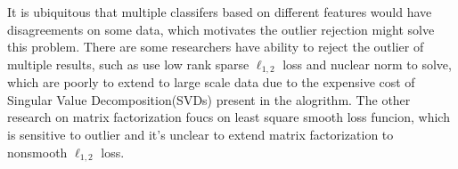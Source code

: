 \documentclass[letterpaper]{article}
\begin{document}


It is ubiquitous that multiple classifers based on different features would have disagreements on some data, which motivates the outlier rejection might solve this problem. There are some researchers have ability to reject the outlier of multiple results, such as \cite{gaoijcai2016robust} use low rank sparse $\ell_{1,2}$ loss and nuclear norm to solve, which are poorly to extend to large scale data due to the expensive cost of Singular Value Decomposition(SVDs) present in the alogrithm. The other research on matrix factorization foucs on least square smooth loss funcion, which is sensitive to outlier and it's unclear to extend matrix factorization to nonsmooth $\ell_{1,2}$ loss.
\end{document}
